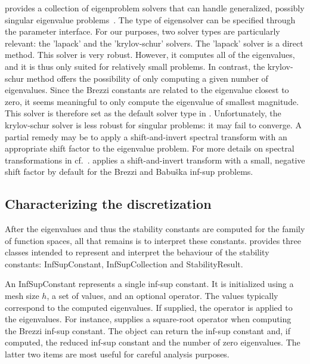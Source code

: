 \slepc{} provides a collection of eigenproblem solvers that can handle
generalized, possibly singular eigenvalue
problems~\cite{HernandezRomanEtAl2005, slepc_users_manual}. The type
of eigensolver can be specified through the \dolfin{} parameter
interface. For our purposes, two solver types are particularly
relevant: the 'lapack' and the 'krylov-schur' solvers.  The 'lapack'
solver is a direct method. This solver is very robust. However, it
computes all of the eigenvalues, and it is thus only suited for
relatively small problems. In contrast, the krylov-schur method offers
the possibility of only computing a given number of eigenvalues. Since
the Brezzi constants are related to the eigenvalue closest to zero, it
seems meaningful to only compute the eigenvalue of smallest
magnitude. This solver is therefore set as the default solver type in
\ascot. Unfortunately, the krylov-schur solver is less robust for
singular problems: it may fail to converge. A partial remedy may be to
apply a shift-and-invert spectral transform with an appropriate shift
factor to the eigenvalue problem. For more details on spectral
transformations in \slepc{} cf.~\cite{slepc_users_manual}. \ascot{}
applies a shift-and-invert transform with a small, negative shift
factor by default for the Brezzi and Babu\v ska inf-sup problems.

\subsection{Characterizing the discretization}

After the eigenvalues and thus the stability constants are computed
for the family of function spaces, all that remains is to interpret
these constants. \ascot{} provides three classes intended to represent
and interpret the behaviour of the stability constants:
\textrm{InfSupConstant}, \textrm{InfSupCollection} and
\textrm{StabilityResult}.

An \textrm{InfSupConstant} represents a single inf-sup constant. It is
initialized using a mesh size $h$, a set of values, and an optional
operator. The values typically correspond to the computed
eigenvalues. If supplied, the operator is applied to the eigenvalues.
For instance, \ascot{} supplies a square-root operator when computing
the Brezzi inf-sup constant. The object can return the inf-sup
constant and, if computed, the reduced inf-sup constant and the number
of zero eigenvalues. The latter two items are most useful for careful
analysis purposes.

